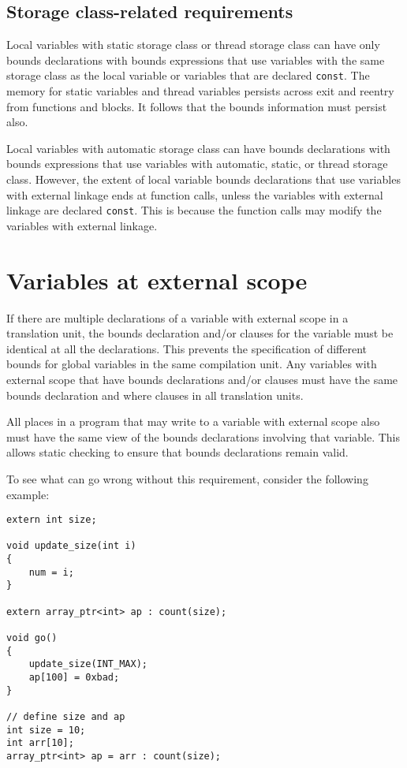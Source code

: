 \subsection{Storage class-related requirements}

Local variables with static storage class or thread storage class can
have only bounds declarations with bounds expressions that use variables
with the same storage class as the local variable or variables that are declared
\texttt{const}. The memory for static variables and thread variables
persists across exit and reentry from functions and blocks. It follows
that the bounds information must persist also.

Local variables with automatic storage class can have bounds
declarations with bounds expressions that use variables with automatic,
static, or thread storage class. However, the extent of local variable
bounds declarations that use variables with external linkage ends at
function calls, unless the variables with external linkage are declared
\texttt{const}. This is because the function calls may modify the
variables with external linkage.

\section{Variables at external scope}
\label{section:external-scope-variables}

If there are multiple declarations of a variable with external scope in
a translation unit, the bounds declaration and/or  clauses for the
variable must be identical at all the declarations. This prevents the
specification of different bounds for global variables in the same
compilation unit. Any variables with external scope that have bounds
declarations and/or  clauses must have the same bounds declaration
and where clauses in all translation units.

All places in a program that may write to a variable with external scope
also must have the same view of the bounds declarations involving that
variable. This allows static checking to ensure that bounds declarations
remain valid.

To see what can go wrong without this requirement, consider the
following example:

\begin{verbatim}
extern int size;

void update_size(int i)
{
    num = i;
}

extern array_ptr<int> ap : count(size);

void go()
{
    update_size(INT_MAX);
    ap[100] = 0xbad;
}

// define size and ap
int size = 10;
int arr[10];
array_ptr<int> ap = arr : count(size);
\end{verbatim}

